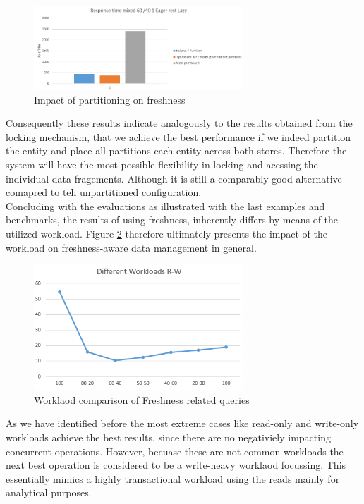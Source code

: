 \begin{figure}[t] 
    \centering 
    \includegraphics[width=0.7\textwidth]{Figures/partioned_freshness.PNG}
    \caption{Impact of partitioning on freshness}
    \label{fig:partition_result}
\end{figure}


Consequently these results indicate analogously to the results obtained from the locking mechanism, that we achieve the best performance
if we indeed partition the entity and place all partitions each entity across both stores. Therefore the system will have the most possible 
flexibility in locking and acessing the individual data fragements. Although 
it is still a comparably good alternative comapred to teh unpartitioned configuration.\\



Concluding with the evaluations as illustrated with the last examples and benchmarks, the results of using freshness, inherently differs by means of the utilized workload.
Figure \ref{fig:workload_comp} therefore ultimately presents the impact of the workload on freshness-aware data management in general. 

\begin{figure}[t] 
    \centering 
    \includegraphics[width=0.7\textwidth]{Figures/different_ workloads.PNG}
    \caption{Worklaod comparison of Freshness related queries}
    \label{fig:workload_comp}
\end{figure}

As we have identified before the most extreme cases like read-only and write-only workloads achieve the best results,
since there are no negativiely impacting concurrent operations.
However, becuase these are not common workloads the next best operation is considered to be a write-heavy worklaod focussing.
This essentially mimics a highly transactional workload using the reads mainly for analytical purposes.


